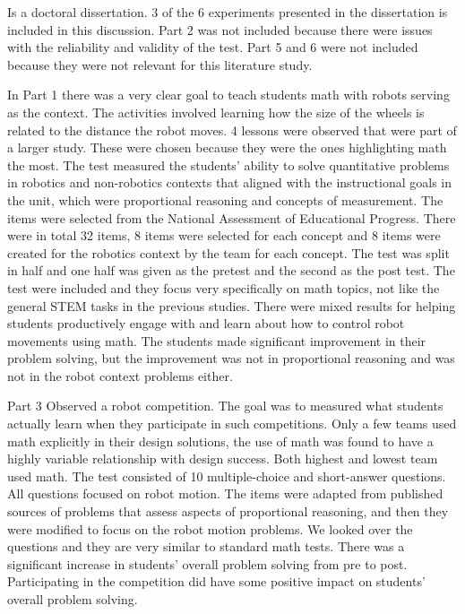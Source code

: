 \bigskip\noindent
\cite{silk2011resources} Is a doctoral dissertation. 3 of the 6 experiments presented in the dissertation is included in this discussion. Part 2 was not included because there were issues with the reliability and validity of the test. Part 5 and 6 were not included because they were not relevant for this literature study.

\bigskip\noindent
In Part 1 there was a very clear goal to teach students math with robots serving as the context. The activities involved learning how the size of the wheels is related to the distance the robot moves. 4 lessons were observed that were part of a larger study. These were chosen because they were the ones highlighting math the most. The test measured the students' ability to solve quantitative problems in robotics and non-robotics contexts that aligned with the instructional goals in the unit, which were proportional reasoning and concepts of measurement. The items were selected from the National Assessment of Educational Progress. There were in total 32 items, 8 items were selected for each concept and 8 items were created for the robotics context by the team for each concept. The test was split in half and one half was given as the pretest and the second as the post test. The test were included and they focus very specifically on math topics, not like the general STEM tasks in the previous studies. There were mixed results for helping students productively engage with and learn about how to control robot movements using math. The students made significant improvement in their problem solving, but the improvement was not in proportional reasoning and was not in the robot context problems either. 

\bigskip\noindent
Part 3 Observed a robot competition. The goal was to measured what students actually learn when they participate in such competitions. Only a few teams used math explicitly in their design solutions, the use of math was found to have a highly variable relationship with design success. Both highest and lowest team used math. The test consisted of 10 multiple-choice and short-answer questions. All questions focused on robot motion. The items were adapted from published sources of problems that assess aspects of proportional reasoning, and then they were modified to focus on the robot motion problems. We looked over the questions and they are very similar to standard math tests. There was a significant increase in students' overall problem solving from pre to post. Participating in the competition did have some positive impact on students' overall problem solving.

